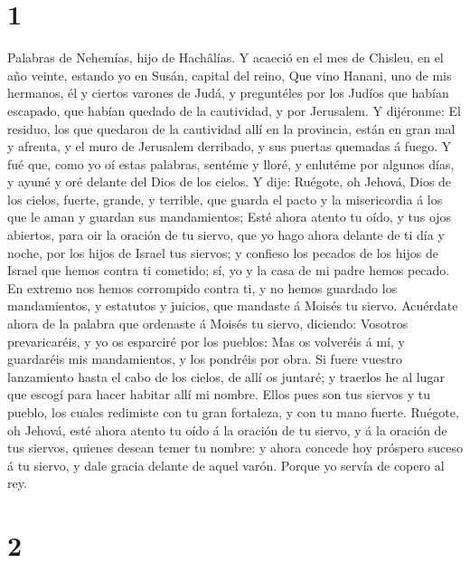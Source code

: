 \hypertarget{section}{%
\section{1}\label{section}}

 Palabras de Nehemías, hijo de Hachâlías. Y acaeció en el
mes de Chisleu, en el año veinte, estando yo en Susán, capital del
reino,  Que vino Hanani, uno de mis hermanos, él y ciertos
varones de Judá, y preguntéles por los Judíos que habían escapado, que
habían quedado de la cautividad, y por Jerusalem.  Y
dijéronme: El residuo, los que quedaron de la cautividad allí en la
provincia, están en gran mal y afrenta, y el muro de Jerusalem
derribado, y sus puertas quemadas á fuego.  Y fué que, como
yo oí estas palabras, sentéme y lloré, y enlutéme por algunos días, y
ayuné y oré delante del Dios de los cielos.  Y dije:
Ruégote, oh Jehová, Dios de los cielos, fuerte, grande, y terrible, que
guarda el pacto y la misericordia á los que le aman y guardan sus
mandamientos;  Esté ahora atento tu oído, y tus ojos
abiertos, para oir la oración de tu siervo, que yo hago ahora delante de
ti día y noche, por los hijos de Israel tus siervos; y confieso los
pecados de los hijos de Israel que hemos contra ti cometido; sí, yo y la
casa de mi padre hemos pecado.  En extremo nos hemos
corrompido contra ti, y no hemos guardado los mandamientos, y estatutos
y juicios, que mandaste á Moisés tu siervo.  Acuérdate ahora
de la palabra que ordenaste á Moisés tu siervo, diciendo: Vosotros
prevaricaréis, y yo os esparciré por los pueblos:  Mas os
volveréis á mí, y guardaréis mis mandamientos, y los pondréis por obra.
Si fuere vuestro lanzamiento hasta el cabo de los cielos, de allí os
juntaré; y traerlos he al lugar que escogí para hacer habitar allí mi
nombre.  Ellos pues son tus siervos y tu pueblo, los cuales
redimiste con tu gran fortaleza, y con tu mano fuerte. 
Ruégote, oh Jehová, esté ahora atento tu oído á la oración de tu siervo,
y á la oración de tus siervos, quienes desean temer tu nombre: y ahora
concede hoy próspero suceso á tu siervo, y dale gracia delante de aquel
varón. Porque yo servía de copero al rey.

\hypertarget{section-1}{%
\section{2}\label{section-1}}

